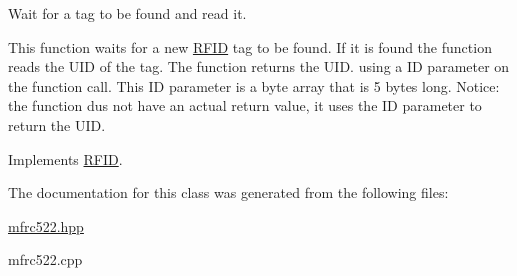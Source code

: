 Wait for a tag to be found and read it. 

This function waits for a new \hyperlink{class_r_f_i_d}{R\+F\+ID} tag to be found. If it is found the function reads the U\+ID of the tag. The function returns the U\+ID. using a ID parameter on the function call. This ID parameter is a byte array that is 5 bytes long. Notice\+: the function dus not have an actual return value, it uses the ID parameter to return the U\+ID. 

Implements \hyperlink{class_r_f_i_d_a7e02863bc0f1f117b05d72f9063497f7}{R\+F\+ID}.



The documentation for this class was generated from the following files\+:\begin{DoxyCompactItemize}
\item 
\hyperlink{mfrc522_8hpp}{mfrc522.\+hpp}\item 
mfrc522.\+cpp\end{DoxyCompactItemize}
